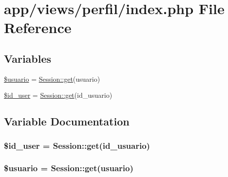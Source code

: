 \hypertarget{app_2views_2perfil_2index_8php}{}\section{app/views/perfil/index.php File Reference}
\label{app_2views_2perfil_2index_8php}
\subsection*{Variables}
\begin{DoxyCompactItemize}
\item 
\hyperlink{app_2views_2perfil_2index_8php_a559c8003f481610caf373b85cc607fb6}{\$usuario} = \hyperlink{class_session_a5b48fff21f9141b53ba79506b6b4375e}{Session\+::get}(\textquotesingle{}usuario\textquotesingle{})
\item 
\hyperlink{app_2views_2perfil_2index_8php_a076f4e9335db95bc9db9c2695d128809}{\$id\+\_\+user} = \hyperlink{class_session_a5b48fff21f9141b53ba79506b6b4375e}{Session\+::get}(\textquotesingle{}id\+\_\+usuario\textquotesingle{})
\end{DoxyCompactItemize}


\subsection{Variable Documentation}
\hypertarget{app_2views_2perfil_2index_8php_a076f4e9335db95bc9db9c2695d128809}{}
\subsubsection[{\$id\+\_\+user}]{\setlength{\rightskip}{0pt plus 5cm}\$id\+\_\+user = {\bf Session\+::get}(\textquotesingle{}id\+\_\+usuario\textquotesingle{})}\label{app_2views_2perfil_2index_8php_a076f4e9335db95bc9db9c2695d128809}
\hypertarget{app_2views_2perfil_2index_8php_a559c8003f481610caf373b85cc607fb6}{}
\subsubsection[{\$usuario}]{\setlength{\rightskip}{0pt plus 5cm}\$usuario = {\bf Session\+::get}(\textquotesingle{}usuario\textquotesingle{})}\label{app_2views_2perfil_2index_8php_a559c8003f481610caf373b85cc607fb6}

